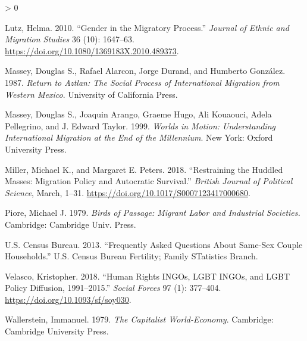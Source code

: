 \documentclass[
  11pt,
]{article}
\newlength{\cslhangindent}
\newenvironment{CSLReferences}[2] %
 {%
  \setlength{\parindent}{0pt}
  \ifodd #1 \everypar{\setlength{\hangindent}{\cslhangindent}}\ignorespaces\fi
  \ifnum #2 > 0
  \setlength{\parskip}{#2\baselineskip}
  \fi
 }%
 {}
\begin{document}
\begin{CSLReferences}{1}{0}
\leavevmode\hypertarget{ref-lutz_2010}{}%
Lutz, Helma. 2010. {``Gender in the {Migratory} {Process}.''} \emph{Journal of Ethnic and Migration Studies} 36 (10): 1647--63. \url{https://doi.org/10.1080/1369183X.2010.489373}.

\leavevmode\hypertarget{ref-massey_1987}{}%
Massey, Douglas S., Rafael Alarcon, Jorge Durand, and Humberto González. 1987. \emph{Return to {Aztlan}: {The} {Social} {Process} of {International} {Migration} from {Western} {Mexico}}. University of California Press.

\leavevmode\hypertarget{ref-massey_1999}{}%
Massey, Douglas S., Joaquin Arango, Graeme Hugo, Ali Kouaouci, Adela Pellegrino, and J. Edward Taylor. 1999. \emph{Worlds in {Motion}: {Understanding} {International} {Migration} at the {End} of the {Millennium}}. New York: Oxford University Press.

\leavevmode\hypertarget{ref-miller_2018}{}%
Miller, Michael K., and Margaret E. Peters. 2018. {``Restraining the {Huddled} {Masses}: {Migration} {Policy} and {Autocratic} {Survival}.''} \emph{British Journal of Political Science}, March, 1--31. \url{https://doi.org/10.1017/S0007123417000680}.

\leavevmode\hypertarget{ref-piore_1979}{}%
Piore, Michael J. 1979. \emph{Birds of Passage: Migrant Labor and Industrial Societies.} Cambridge: Cambridge Univ. Press.

\leavevmode\hypertarget{ref-u.s.censusbureau_2013}{}%
U.S. Census Bureau. 2013. {``Frequently {Asked} {Questions} {About} {Same}-{Sex} {Couple} {Households}.''} U.S. Census Bureau Fertility; Family STatistics Branch.

\leavevmode\hypertarget{ref-velasco_2018}{}%
Velasco, Kristopher. 2018. {``Human {Rights} {INGOs}, {LGBT} {INGOs}, and {LGBT} {Policy} {Diffusion}, 1991--2015.''} \emph{Social Forces} 97 (1): 377--404. \url{https://doi.org/10.1093/sf/soy030}.

\leavevmode\hypertarget{ref-wallerstein_1979}{}%
Wallerstein, Immanuel. 1979. \emph{The {Capitalist} {World}-{Economy}}. Cambridge: Cambridge University Press.

\end{CSLReferences}
\end{document}
